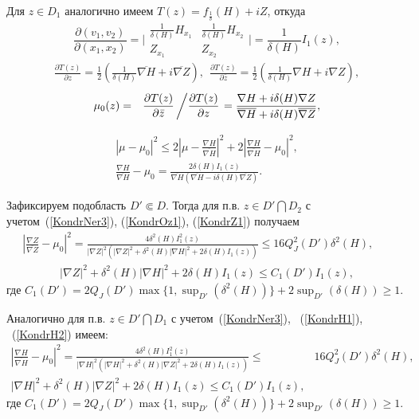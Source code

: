 Для $z\in D_1$ аналогично имеем  $T(z)=f_{\frac1\delta}(H)+i Z$, откуда
$$\frac{\partial(v_1,v_2)}{\partial(x_1,x_2)}=\biggl|
\begin{array}{cc}
\frac{1}{\delta(H)} H_{x_1}&\frac{1}{\delta(H)} H_{x_2}\\
Z_{x_1}&Z_{x_2}
\end{array}
\biggr|=\frac{1}{\delta(H)} I_1(z),$$
\begin{eqnarray}
\frac{\partial T(z)}{\partial z}=\frac12\left(
\frac{1}{\delta(H)}\overline{\nabla H} +i\overline{\nabla Z}
\right), \  \
\frac{\partial T(z)}{\partial {\bar z}}= \frac12\left(
\frac{1}{\delta(H)}\nabla H +i\nabla Z
\right),
\nonumber
\end{eqnarray}
\begin{eqnarray}{\mu_0}(z)&=&\frac{\partial T(z)}{\partial {\bar z}}\left/
\frac{\partial T(z)}{\partial z}\right.=
\frac{\nabla H +i\delta(H)\nabla Z}{\overline{\nabla H} +i\delta(H)\overline{\nabla Z}},\label{mu2}\nonumber
\end{eqnarray}

\begin{eqnarray}\label{KondrH1}
|\mu-{\mu_0}|^2
\leq 2\left| \mu-\frac{\nabla
H}{\overline{\nabla
H}}\right|^2+2\left|\frac{\nabla
H}{\overline{\nabla H}}-{\mu_0} \right|^2,\\
\frac{\nabla H}{\overline{\nabla H}}- {\mu_0}=
\frac{2\delta(H) I_1(z)}{\overline{\nabla H}(\overline{\nabla H}-i\delta(H)\overline{\nabla Z})}. \label{KondrH2}
\end{eqnarray}


Зафиксируем подобласть $D'\Subset D$. Тогда для
п.в.  $z\in D'\bigcap D_2$ с учетом~(\ref{KondrNer3}), (\ref{KondrOz1}), (\ref{KondrZ1}) получаем
\begin{eqnarray}
\left| \frac{\nabla Z}{\overline{\nabla Z}}-
{\mu_0} \right|^2= \frac{4\delta^2(H) I_1^2(z)}{|\nabla
Z|^2(|\nabla Z|^2+\delta^2(H)|\nabla
H|^2+2\delta(H)
I_1(z))}
\leq16Q_J^2(D')\delta^2(H),&&
\label{KondrNer4}
\end{eqnarray}
\begin{eqnarray}
&|\nabla
Z|^2+\delta^2(H)|\nabla H|^2+2\delta(H) I_1(z)\leq
 C_1(D')I_1(z),& \label{KondrNer4plus}
\end{eqnarray}
где $C_1(D')=2Q_J(D')\max\{1,\sup_{D'}(\delta^2(H))\}+
2\sup_{D'}(\delta(H))\geq1$.

Аналогично для п.в.  $z\in D'\bigcap D_1$ с учетом~(\ref{KondrNer3}), ~(\ref{KondrH1}),  ~(\ref{KondrH2}) имеем:
\begin{eqnarray}
\left| \frac{\nabla H}{\overline{\nabla H}}-
{\mu_0} \right|^2=
\frac{4\delta^2(H) I_1^2(z)}{|\nabla H|^2(|\nabla
H|^2+\delta^2(H)|\nabla Z|^2+2\delta(H) I_1(z))}
\leq
&16Q_J^2(D')\delta^2(H),\label{KondrNer5}\nonumber
\\
|\nabla
H|^2+\delta^2(H)|\nabla Z|^2+2\delta(H) I_1(z)\leq
 C_1(D')I_1(z), \label{KondrHZ-ner}\nonumber
\end{eqnarray}
где $C_1(D')=2Q_J(D')\max\{1,\sup_{D'}(\delta^2(H))\}+
2\sup_{D'}(\delta(H))\geq1.$

